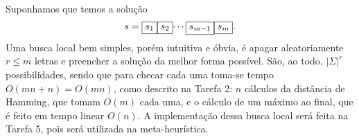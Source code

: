 Suponhamos que temos a solução
\[s = \text{\fbox{$s_1$}\fbox{$s_2$}$\cdots$\fbox{$s_{m-1}$}\fbox{$s_m$}}.\]
Uma busca local bem simples, porém intuitiva e óbvia, é apagar aleatoriamente $r \le m$ letras e preencher a solução da melhor forma possível. São, ao todo, $|\Sigma|^r$ possibilidades, sendo que para checar cada uma toma-se tempo $O(mn+n) = O(mn)$, como descrito na Tarefa 2: $n$ cálculos da distância de Hamming, que tomam $O(m)$ cada uma, e o cálculo de um máximo ao final, que é feito em tempo linear $O(n)$.
A implementação dessa busca local será feita na Tarefa 5, pois será utilizada na meta-heurística.
